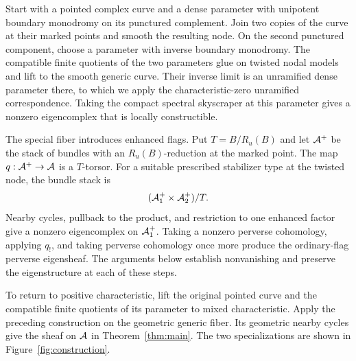 Start with a pointed complex curve and a dense parameter with unipotent
boundary monodromy on its punctured complement. Join two copies of the curve
at their marked points and smooth the resulting node. On the second
punctured component, choose a parameter
with inverse boundary monodromy. The compatible finite quotients of the two
parameters glue on twisted nodal models and lift to the smooth generic
curve. Their inverse limit is an unramified dense parameter there, to which
we apply the characteristic-zero unramified correspondence. Taking the
compact spectral skyscraper at this parameter gives a nonzero eigencomplex
that is locally constructible.

The special fiber introduces enhanced flags. Put $T=B/R_u(B)$ and let
$\mathcal A^+$ be the stack of bundles with an $R_u(B)$-reduction at the marked
point. The map $q:\mathcal A^+\to\mathcal A$ is a $T$-torsor. For a suitable prescribed
stabilizer type at the twisted node, the bundle stack is
\[
 (\mathcal A_1^+\times\mathcal A_2^+)/T.
\]
Nearby cycles, pullback to the product, and restriction to one enhanced
factor give a nonzero eigencomplex on $\mathcal A_1^+$. Taking a nonzero perverse
cohomology, applying $q_!$, and taking perverse cohomology once more produce
the ordinary-flag perverse eigensheaf. The arguments below establish
nonvanishing and preserve the eigenstructure at each of these steps.

To return to positive characteristic, lift the original pointed curve and
the compatible finite quotients of its parameter to mixed characteristic.
Apply the preceding construction on the geometric generic fiber. Its
geometric nearby cycles give the sheaf on $\mathcal A$ in
Theorem~\ref{thm:main}. The two specializations are shown in
Figure~\ref{fig:construction}.

